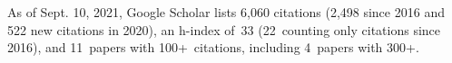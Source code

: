%
As of Sept. 10, 2021, Google Scholar lists
6,060 citations (2,498 since 2016 and 522 new citations in 2020),
an h-index of~33 (22~counting only citations since 2016),
and 11~papers with 100+~citations, including 4~papers with 300+.
